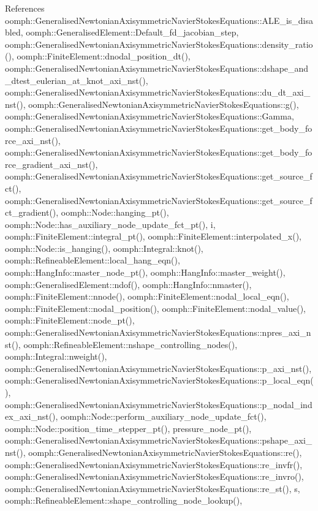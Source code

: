 References oomph\+::\+Generalised\+Newtonian\+Axisymmetric\+Navier\+Stokes\+Equations\+::\+A\+L\+E\+\_\+is\+\_\+disabled, oomph\+::\+Generalised\+Element\+::\+Default\+\_\+fd\+\_\+jacobian\+\_\+step, oomph\+::\+Generalised\+Newtonian\+Axisymmetric\+Navier\+Stokes\+Equations\+::density\+\_\+ratio(), oomph\+::\+Finite\+Element\+::dnodal\+\_\+position\+\_\+dt(), oomph\+::\+Generalised\+Newtonian\+Axisymmetric\+Navier\+Stokes\+Equations\+::dshape\+\_\+and\+\_\+dtest\+\_\+eulerian\+\_\+at\+\_\+knot\+\_\+axi\+\_\+nst(), oomph\+::\+Generalised\+Newtonian\+Axisymmetric\+Navier\+Stokes\+Equations\+::du\+\_\+dt\+\_\+axi\+\_\+nst(), oomph\+::\+Generalised\+Newtonian\+Axisymmetric\+Navier\+Stokes\+Equations\+::g(), oomph\+::\+Generalised\+Newtonian\+Axisymmetric\+Navier\+Stokes\+Equations\+::\+Gamma, oomph\+::\+Generalised\+Newtonian\+Axisymmetric\+Navier\+Stokes\+Equations\+::get\+\_\+body\+\_\+force\+\_\+axi\+\_\+nst(), oomph\+::\+Generalised\+Newtonian\+Axisymmetric\+Navier\+Stokes\+Equations\+::get\+\_\+body\+\_\+force\+\_\+gradient\+\_\+axi\+\_\+nst(), oomph\+::\+Generalised\+Newtonian\+Axisymmetric\+Navier\+Stokes\+Equations\+::get\+\_\+source\+\_\+fct(), oomph\+::\+Generalised\+Newtonian\+Axisymmetric\+Navier\+Stokes\+Equations\+::get\+\_\+source\+\_\+fct\+\_\+gradient(), oomph\+::\+Node\+::hanging\+\_\+pt(), oomph\+::\+Node\+::has\+\_\+auxiliary\+\_\+node\+\_\+update\+\_\+fct\+\_\+pt(), i, oomph\+::\+Finite\+Element\+::integral\+\_\+pt(), oomph\+::\+Finite\+Element\+::interpolated\+\_\+x(), oomph\+::\+Node\+::is\+\_\+hanging(), oomph\+::\+Integral\+::knot(), oomph\+::\+Refineable\+Element\+::local\+\_\+hang\+\_\+eqn(), oomph\+::\+Hang\+Info\+::master\+\_\+node\+\_\+pt(), oomph\+::\+Hang\+Info\+::master\+\_\+weight(), oomph\+::\+Generalised\+Element\+::ndof(), oomph\+::\+Hang\+Info\+::nmaster(), oomph\+::\+Finite\+Element\+::nnode(), oomph\+::\+Finite\+Element\+::nodal\+\_\+local\+\_\+eqn(), oomph\+::\+Finite\+Element\+::nodal\+\_\+position(), oomph\+::\+Finite\+Element\+::nodal\+\_\+value(), oomph\+::\+Finite\+Element\+::node\+\_\+pt(), oomph\+::\+Generalised\+Newtonian\+Axisymmetric\+Navier\+Stokes\+Equations\+::npres\+\_\+axi\+\_\+nst(), oomph\+::\+Refineable\+Element\+::nshape\+\_\+controlling\+\_\+nodes(), oomph\+::\+Integral\+::nweight(), oomph\+::\+Generalised\+Newtonian\+Axisymmetric\+Navier\+Stokes\+Equations\+::p\+\_\+axi\+\_\+nst(), oomph\+::\+Generalised\+Newtonian\+Axisymmetric\+Navier\+Stokes\+Equations\+::p\+\_\+local\+\_\+eqn(), oomph\+::\+Generalised\+Newtonian\+Axisymmetric\+Navier\+Stokes\+Equations\+::p\+\_\+nodal\+\_\+index\+\_\+axi\+\_\+nst(), oomph\+::\+Node\+::perform\+\_\+auxiliary\+\_\+node\+\_\+update\+\_\+fct(), oomph\+::\+Node\+::position\+\_\+time\+\_\+stepper\+\_\+pt(), pressure\+\_\+node\+\_\+pt(), oomph\+::\+Generalised\+Newtonian\+Axisymmetric\+Navier\+Stokes\+Equations\+::pshape\+\_\+axi\+\_\+nst(), oomph\+::\+Generalised\+Newtonian\+Axisymmetric\+Navier\+Stokes\+Equations\+::re(), oomph\+::\+Generalised\+Newtonian\+Axisymmetric\+Navier\+Stokes\+Equations\+::re\+\_\+invfr(), oomph\+::\+Generalised\+Newtonian\+Axisymmetric\+Navier\+Stokes\+Equations\+::re\+\_\+invro(), oomph\+::\+Generalised\+Newtonian\+Axisymmetric\+Navier\+Stokes\+Equations\+::re\+\_\+st(), s, oomph\+::\+Refineable\+Element\+::shape\+\_\+controlling\+\_\+node\+\_\+lookup(), 